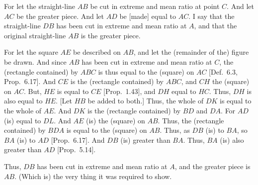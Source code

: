 \begin{Parallel}{}{}
{
\centerline{}

For let the straight-line $AB$ be cut in extreme and mean ratio
at point $C$. And let $AC$ be the greater piece. And let $AD$
be [made] equal to $AC$. I say that the straight-line $DB$ has been cut in extreme and
mean ratio at $A$, and that the original straight-line $AB$ is
the greater piece.

For let the square $AE$ be described on $AB$, and
let the (remainder of the) figure be drawn. And since
$AB$ has been cut in extreme and mean ratio at $C$, the (rectangle
contained) by $ABC$ is thus equal to the (square) on $AC$
[Def.~6.3, Prop.~6.17].  And $CE$ is the (rectangle contained)
by  $ABC$,  and $CH$ the (square) on $AC$. But, $HE$ is equal
to $CE$ [Prop.~1.43], and $DH$ equal to $HC$. Thus, $DH$ is also
equal to $HE$. [Let $HB$ be added to both.] Thus, the whole
of $DK$ is equal to the whole of $AE$. And $DK$ is the
(rectangle contained) by $BD$ and $DA$. For $AD$ (is) equal to
$DL$. And $AE$ (is) the (square) on $AB$.  Thus, the (rectangle
contained) by $BDA$ is equal to the (square) on $AB$. Thus, as
$DB$ (is) to $BA$, so $BA$ (is) to $AD$ [Prop.~6.17]. And
$DB$ (is) greater than $BA$. Thus, $BA$ (is) also greater
than $AD$ [Prop.~5.14].

Thus, $DB$ has been cut in extreme and mean ratio at $A$, and the
greater piece is $AB$. (Which is) the very thing it was required to show.}
\end{Parallel}

